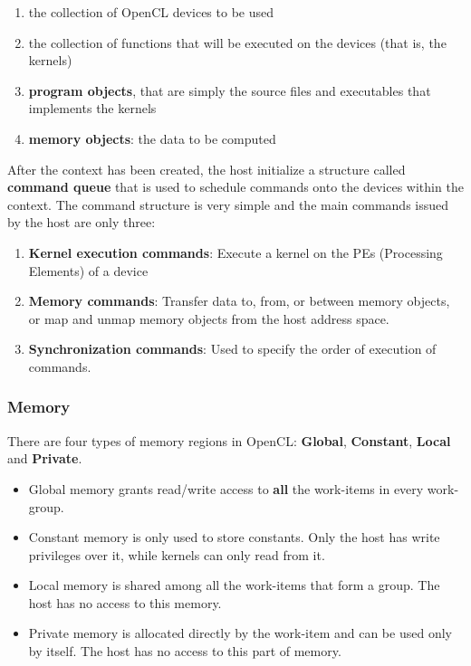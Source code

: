 \begin{enumerate}
	\item the collection of OpenCL devices to be used
	\item the collection of functions that will be executed on the devices (that is, the kernels)
	\item \textbf{program objects}, that are simply the source files and executables that implements the kernels
	\item \textbf{memory objects}: the data to be computed
\end{enumerate}

After the context has been created, the host initialize a structure called \textbf{command queue} that is used to schedule commands onto the devices within the context. The command structure is very simple and the main commands issued by the host are only three:

\begin{enumerate}
	\item \textbf{Kernel execution commands}: Execute a kernel on the PEs (Processing Elements) of a device
	\item \textbf{Memory commands}: Transfer data to, from, or between memory objects, or map and unmap
memory objects from the host address space.
	\item	\textbf{Synchronization commands}: Used to specify the order of execution of commands.
\end{enumerate}

\subsubsection{Memory}

There are four types of memory regions in OpenCL: \textbf{Global}, \textbf{Constant}, \textbf{Local} and \textbf{Private}.

\begin{itemize}
	\item Global memory grants read/write access to \textbf{all} the work-items in every work-group.
	\item Constant memory is only used to store constants. Only the host has write privileges over it, while kernels can only read from it.
	\item Local memory is shared among all the work-items that form a group. The host has no access to this memory.
	\item Private memory is allocated directly by the work-item and can be used only by itself. The host has no access to this part of memory.
\end{itemize}

